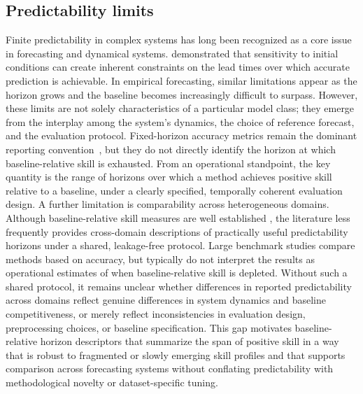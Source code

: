 \documentclass[pdflatex,sn-mathphys]{sn-jnl}
\begin{document}
\subsection{Predictability limits}
Finite predictability in complex systems has long been recognized as a
core issue in forecasting and dynamical systems. \citet{lorenz1969}
demonstrated that sensitivity to initial conditions can create inherent
constraints on the lead times over which accurate prediction is
achievable. In empirical forecasting, similar limitations appear as the
horizon grows and the baseline becomes increasingly difficult to surpass.
However, these limits are not solely characteristics of a particular
model class; they emerge from the interplay among the system's dynamics,
the choice of reference forecast, and the evaluation protocol.
Fixed-horizon accuracy metrics remain the dominant reporting convention~\citep{makridakis2020,godahewa2021},
but they do not directly identify the horizon at which baseline-relative
skill is exhausted. From an operational standpoint, the key quantity is
the range of horizons over which a method achieves positive skill
relative to a baseline, under a clearly specified, temporally coherent
evaluation design.
A further limitation is comparability across heterogeneous domains.
Although baseline-relative skill measures are well established
\citep{hyndman2006, murphy1993, tashman2000}, the literature less
frequently provides cross-domain descriptions of practically useful
predictability horizons under a shared, leakage-free protocol. Large
benchmark studies \citep{makridakis2020, godahewa2021} compare methods
based on accuracy, but typically do not interpret the results as
operational estimates of when baseline-relative skill is depleted.
Without such a shared protocol, it remains unclear whether differences in
reported predictability across domains reflect genuine differences in system
dynamics and baseline competitiveness, or merely reflect inconsistencies in
evaluation design, preprocessing choices, or baseline specification.
This gap motivates baseline-relative horizon descriptors that summarize
the span of positive skill in a way that is robust to fragmented or
slowly emerging skill profiles and that supports comparison across
forecasting systems without conflating predictability with
methodological novelty or dataset-specific tuning.

\end{document}
